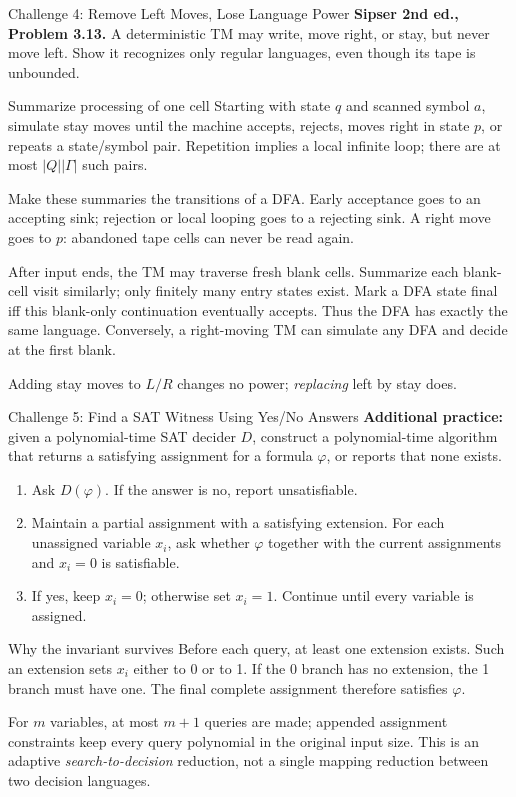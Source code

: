\documentclass[10pt]{beamer}
\begin{document}
\begin{frame}{Challenge 4: Remove Left Moves, Lose Language Power}
  \small
  \textbf{Sipser 2nd ed., Problem 3.13.} A deterministic TM may write,
  move right, or stay, but never move left. Show it recognizes only regular
  languages, even though its tape is unbounded.
  \begin{block}{Summarize processing of one cell}
    Starting with state $q$ and scanned symbol $a$, simulate stay moves
    until the machine accepts, rejects, moves right in state $p$, or
    repeats a state/symbol pair. Repetition implies a local infinite loop;
    there are at most $|Q||\Gamma|$ such pairs.
  \end{block}
  Make these summaries the transitions of a DFA. Early acceptance goes
  to an accepting sink; rejection or local looping goes to a rejecting sink.
  A right move goes to $p$: abandoned tape cells can never be read again.
  \par\smallskip
  After input ends, the TM may traverse fresh blank cells. Summarize each
  blank-cell visit similarly; only finitely many entry states exist.
  Mark a DFA state final iff this blank-only continuation eventually accepts.
  Thus the DFA has exactly the same language. Conversely, a right-moving
  TM can simulate any DFA and decide at the first blank.
  \par\smallskip
  Adding stay moves to $L/R$ changes no power; \emph{replacing} left by stay does.
\end{frame}

\begin{frame}{Challenge 5: Find a SAT Witness Using Yes/No Answers}
  \small
  \textbf{Additional practice:} given a polynomial-time SAT decider $D$,
  construct a polynomial-time algorithm that returns a satisfying assignment
  for a formula $\varphi$, or reports that none exists.
  \begin{enumerate}
    \item Ask $D(\varphi)$. If the answer is no, report unsatisfiable.
    \item Maintain a partial assignment with a satisfying extension.
      For each unassigned variable $x_i$, ask whether
      $\varphi$ together with the current assignments and $x_i=0$ is satisfiable.
    \item If yes, keep $x_i=0$; otherwise set $x_i=1$.
      Continue until every variable is assigned.
  \end{enumerate}
  \begin{block}{Why the invariant survives}
    Before each query, at least one extension exists. Such an extension
    sets $x_i$ either to 0 or to 1. If the 0 branch has no extension, the
    1 branch must have one. The final complete assignment therefore satisfies
    $\varphi$.
  \end{block}
  For $m$ variables, at most $m+1$ queries are made; appended assignment
  constraints keep every query polynomial in the original input size.
  This is an adaptive \emph{search-to-decision} reduction, not a single
  mapping reduction between two decision languages.
\end{frame}
\end{document}
